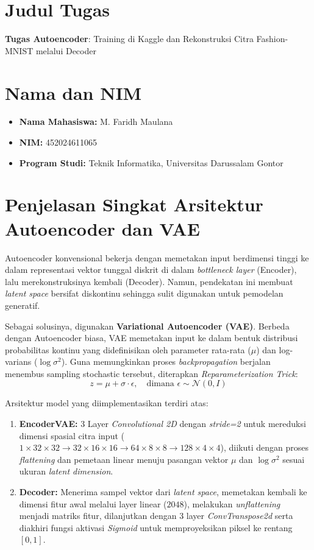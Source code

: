 \documentclass[12pt,titlepage]{article}
\begin{document}
\section*{Judul Tugas}
\textbf{Tugas Autoencoder}: Training di Kaggle dan Rekonstruksi Citra Fashion-MNIST melalui Decoder

\section*{Nama dan NIM}
\begin{itemize}
	\item \textbf{Nama Mahasiswa:} M. Faridh Maulana
	\item \textbf{NIM:} 452024611065
	\item \textbf{Program Studi:} Teknik Informatika, Universitas Darussalam Gontor
\end{itemize}

\section{Penjelasan Singkat Arsitektur Autoencoder dan VAE}
Autoencoder konvensional bekerja dengan memetakan input berdimensi tinggi ke dalam representasi vektor tunggal diskrit di dalam \textit{bottleneck layer} (Encoder), lalu merekonstruksinya kembali (Decoder). Namun, pendekatan ini membuat \textit{latent space} bersifat diskontinu sehingga sulit digunakan untuk pemodelan generatif.

Sebagai solusinya, digunakan \textbf{Variational Autoencoder (VAE)}. Berbeda dengan Autoencoder biasa, VAE memetakan input ke dalam bentuk distribusi probabilitas kontinu yang didefinisikan oleh parameter rata-rata ($\mu$) dan log-varians ($\log \sigma^2$). Guna memungkinkan proses \textit{backpropagation} berjalan menembus sampling stochastic tersebut, diterapkan \textit{Reparameterization Trick}:
\begin{equation}
	z = \mu + \sigma \cdot \epsilon, \quad \text{dimana } \epsilon \sim \mathcal{N}(0, I)
\end{equation}

Arsitektur model yang diimplementasikan terdiri atas:
\begin{enumerate}
	\item \textbf{EncoderVAE:} 3 Layer \textit{Convolutional 2D} dengan \textit{stride=2} untuk mereduksi dimensi spasial citra input ($1 \times 32 \times 32 \rightarrow 32 \times 16 \times 16 \rightarrow 64 \times 8 \times 8 \rightarrow 128 \times 4 \times 4$), diikuti dengan proses \textit{flattening} dan pemetaan linear menuju pasangan vektor $\mu$ dan $\log \sigma^2$ sesuai ukuran \textit{latent dimension}.
	\item \textbf{Decoder:} Menerima sampel vektor dari \textit{latent space}, memetakan kembali ke dimensi fitur awal melalui layer linear ($2048$), melakukan \textit{unflattening} menjadi matriks fitur, dilanjutkan dengan 3 layer \textit{ConvTranspose2d} serta diakhiri fungsi aktivasi \textit{Sigmoid} untuk memproyeksikan piksel ke rentang $[0, 1]$.
\end{enumerate}
\end{document}
